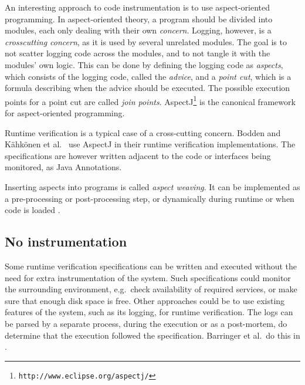 \documentclass[a4paper,11pt]{kth-mag}
\theoremstyle{definition}
\begin{document}
An interesting approach to code instrumentation is to use aspect-oriented
programming. In aspect-oriented theory, a program should be divided into
modules, each only dealing with their own \textit{concern}. Logging, however,
is a \textit{crosscutting concern}, as it is used by several unrelated modules.
The goal is to not scatter logging code across the modules, and to not tangle
it with the modules' own logic. This can be done by defining the logging code
as \textit{aspects}, which consists of the logging code, called the
\textit{advice}, and a \textit{point cut}, which is a formula describing when
the advice should be executed. The possible execution points for a point cut
are called \textit{join points}.
AspectJ\footnote{\texttt{http://www.eclipse.org/aspectj/}} is the canonical
framework for aspect-oriented programming.

Runtime verification is a typical case of a cross-cutting concern. Bodden
\cite{bodden05efficientrv} and Kähkönen et al.\ \cite{kahkonen09lime} use
AspectJ in their runtime verification implementations. The specifications are
however written adjacent to the code or interfaces being monitored, as Java
Annotations.

Inserting aspects into programs is called \textit{aspect weaving}. It can be
implemented as a pre-processing or post-processing step, or dynamically during
runtime or when code is loaded \cite{kiczales01aspect, matusiak09aoppy}.


\subsection{No instrumentation}

Some runtime verification specifications can be written and executed without
the need for extra instrumentation of the system. Such specifications could
monitor the surrounding environment, e.g.\ check availability of required
services, or make sure that enough disk space is free. Other approaches could be
to use existing features of the system, such as its logging, for runtime
verification. The logs can be parsed by a separate process, during the
execution or as a post-mortem, do determine that the execution followed the
specification. Barringer et al.\ do this in \cite{barringer09tutorial}.





\end{document}
